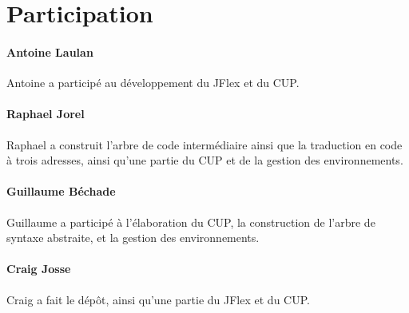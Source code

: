 \documentclass[a4paper,oneside]{article}
\begin{document}
  \section{Participation}

  \paragraph{Antoine Laulan}  
  Antoine a participé au développement du JFlex et du CUP.
  
  \paragraph{Raphael Jorel}
  Raphael a construit l'arbre de code intermédiaire ainsi que la traduction en code à trois adresses, ainsi qu'une partie du CUP et de la gestion des environnements.
  
  \paragraph{Guillaume Béchade}
  Guillaume a participé à l'élaboration du CUP, la construction de l'arbre de syntaxe abstraite, et la gestion des environnements.
  

  \paragraph{Craig Josse}
  Craig a fait le dépôt, ainsi qu'une partie du JFlex et du CUP.
  
\end{document}
